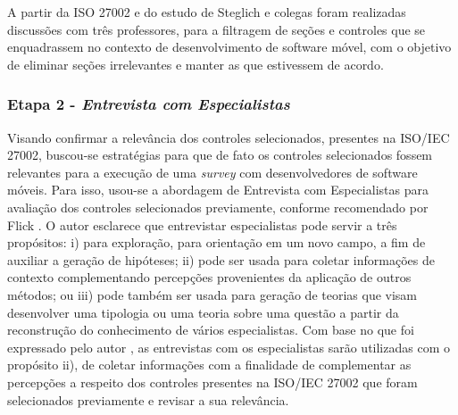 

 A partir da ISO 27002 e do estudo de Steglich e colegas \cite{caio2019} foram realizadas discussões com três professores, para a filtragem de seções e controles que se enquadrassem no contexto de desenvolvimento de software móvel, com o objetivo de eliminar seções irrelevantes e manter as que estivessem de acordo.
 



\subsubsection{ Etapa 2 - \textit{Entrevista com Especialistas}}

Visando confirmar a relevância dos controles selecionados, presentes na ISO/IEC 27002, buscou-se estratégias para que de fato os controles selecionados fossem relevantes para a execução de uma \textit{survey} com desenvolvedores de software móveis. Para isso, usou-se a abordagem de Entrevista com Especialistas para avaliação dos controles selecionados previamente, conforme recomendado por Flick \cite{flick2018introduction}. O autor esclarece que entrevistar especialistas pode servir a três propósitos: i) para exploração, para orientação em um novo campo, a fim de auxiliar a geração de hipóteses; ii) pode ser usada para coletar informações de contexto complementando percepções provenientes da aplicação de outros métodos; ou iii) pode também ser usada para geração de teorias que visam desenvolver uma tipologia ou uma teoria sobre uma questão a partir da reconstrução do conhecimento de vários especialistas. Com base no que foi expressado pelo autor \cite{flick2018introduction}, as entrevistas com os especialistas sarão utilizadas com o propósito ii), de coletar informações com a finalidade de complementar as percepções a respeito dos controles presentes na ISO/IEC 27002 que foram selecionados previamente e revisar a sua relevância.


